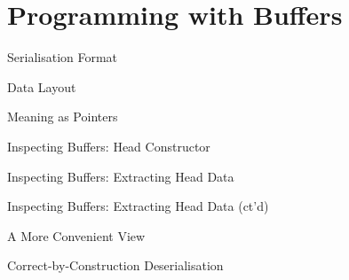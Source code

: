 
\section{Programming with Buffers}

\begin{frame}{Serialisation Format}
\vfill

\end{frame}

\begin{frame}{Data Layout}
  \begin{minipage}{\textwidth}
    \hspace{-1.5em}
    
  \end{minipage}
  \vfill
  
\end{frame}

\begin{frame}{Meaning as Pointers}

\end{frame}

\begin{frame}{Inspecting Buffers: Head Constructor}
\end{frame}

\begin{frame}{Inspecting Buffers: Extracting Head Data}
\end{frame}
\begin{frame}{Inspecting Buffers: Extracting Head Data (ct'd)}
\end{frame}

\begin{frame}{A More Convenient View}
\end{frame}

\begin{frame}{Correct-by-Construction Deserialisation}
\end{frame}
